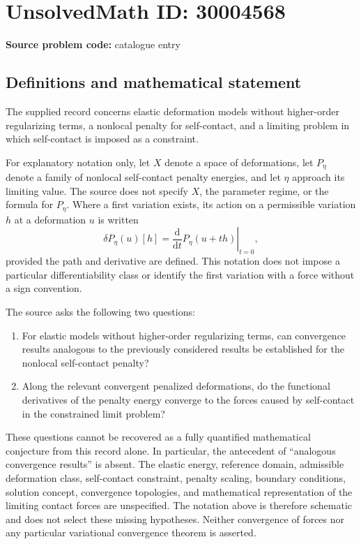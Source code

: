 \documentclass[11pt]{article}
\begin{document}
\section*{UnsolvedMath ID: 30004568}
\textbf{Source problem code:} catalogue entry
\subsection{Definitions and mathematical statement}
The supplied record concerns elastic deformation models without higher-order regularizing terms, a nonlocal penalty for self-contact, and a limiting problem in which self-contact is imposed as a constraint.

For explanatory notation only, let \(X\) denote a space of deformations, let \(P_\eta\) denote a family of nonlocal self-contact penalty energies, and let \(\eta\) approach its limiting value. The source does not specify \(X\), the parameter regime, or the formula for \(P_\eta\). Where a first variation exists, its action on a permissible variation \(h\) at a deformation \(u\) is written
\[
\delta P_\eta(u)[h]
 = \left.\frac{\mathrm d}{\mathrm dt}P_\eta(u+t h)\right|_{t=0},
\]
provided the path and derivative are defined. This notation does not impose a particular differentiability class or identify the first variation with a force without a sign convention.

The source asks the following two questions:
\begin{enumerate}
\item For elastic models without higher-order regularizing terms, can convergence results analogous to the previously considered results be established for the nonlocal self-contact penalty?
\item Along the relevant convergent penalized deformations, do the functional derivatives of the penalty energy converge to the forces caused by self-contact in the constrained limit problem?
\end{enumerate}

These questions cannot be recovered as a fully quantified mathematical conjecture from this record alone. In particular, the antecedent of ``analogous convergence results'' is absent. The elastic energy, reference domain, admissible deformation class, self-contact constraint, penalty scaling, boundary conditions, solution concept, convergence topologies, and mathematical representation of the limiting contact forces are unspecified. The notation above is therefore schematic and does not select these missing hypotheses. Neither convergence of forces nor any particular variational convergence theorem is asserted.
\end{document}
